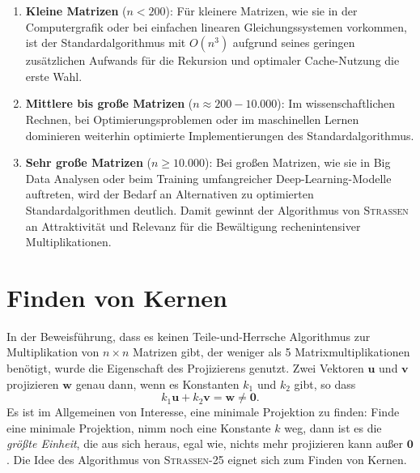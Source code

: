 \documentclass{report}
\numberwithin{equation}{section}
\begin{document}
\begin{enumerate}
	\item \textbf{Kleine Matrizen} ($n < 200$): Für kleinere Matrizen, wie sie in der Computergrafik oder bei einfachen linearen Gleichungssystemen vorkommen, ist der Standardalgorithmus mit $O(n^3)$ aufgrund seines geringen zusätzlichen Aufwands für die Rekursion und optimaler Cache-Nutzung die erste Wahl.
	
	\item \textbf{Mittlere bis große Matrizen} ($n \approx 200 - 10.000$): Im wissenschaftlichen Rechnen, bei Optimierungsproblemen oder im maschinellen Lernen dominieren weiterhin optimierte Implementierungen des Standardalgorithmus.
	
	\item \textbf{Sehr große Matrizen} ($n \ge 10.000$): Bei großen Matrizen, wie sie in Big Data Analysen oder beim Training umfangreicher Deep-Learning-Modelle auftreten, wird der Bedarf an Alternativen zu optimierten Standardalgorithmen deutlich. Damit gewinnt der Algorithmus von \textsc{Strassen} an Attraktivität und Relevanz für die Bewältigung rechenintensiver Multiplikationen.
\end{enumerate}

\section{Finden von Kernen}
In der Beweisführung, dass es keinen Teile-und-Herrsche Algorithmus zur Multiplikation von $n \times n$ Matrizen gibt, der weniger als 5 Matrixmultiplikationen benötigt, wurde die Eigenschaft des Projizierens genutzt. Zwei Vektoren $\boldsymbol{u}$ und $\boldsymbol{v}$ projizieren $\boldsymbol{w}$ genau dann, wenn es Konstanten $k_1$ und $k_2$ gibt, so dass $$k_1 \boldsymbol{u} + k_2\boldsymbol{v} = \boldsymbol{w} \neq \boldsymbol{0}.$$ Es ist im Allgemeinen von Interesse, eine minimale Projektion zu finden: Finde eine minimale Projektion, nimm noch eine Konstante $k$ weg, dann ist es die \textit{größte Einheit}, die aus sich heraus, egal wie, nichts mehr projizieren kann außer $\boldsymbol{0}$. Die Idee des Algorithmus von \textsc{Strassen-25} eignet sich zum Finden von Kernen.
\end{document}
